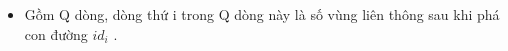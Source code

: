 \begin{itemize}
	\item     Gồm Q dòng, dòng thứ i trong Q dòng này là số vùng liên thông sau khi phá con đường $id_{i}$    .   
\end{itemize}